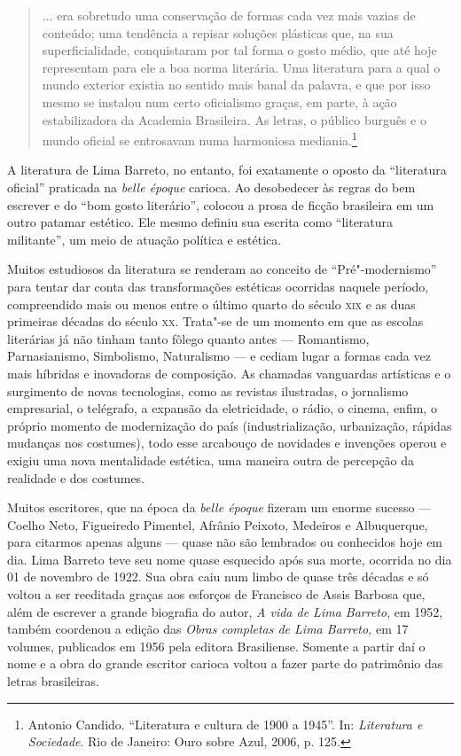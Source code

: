 \documentclass[11pt]{extarticle}
\begin{document}
{{\begin{quote}
... era sobretudo uma conservação de formas cada vez mais vazias de
conteúdo; uma tendência a repisar soluções plásticas que, na sua
superficialidade, conquistaram por tal forma o gosto médio, que até hoje
representam para ele a boa norma literária. Uma literatura para a qual o
mundo exterior existia no sentido mais banal da palavra, e que por isso
mesmo se instalou num certo oficialismo graças, em parte, à ação
estabilizadora da Academia Brasileira. As letras, o público burguês e o
mundo oficial se entrosavam numa harmoniosa mediania.\footnote{Antonio Candido. 
``Literatura e cultura de 1900 a 1945''. In: \emph{Literatura
  e Sociedade}. Rio de Janeiro: Ouro sobre Azul, 2006, p. 125.}
\end{quote}

A literatura de Lima Barreto, no entanto, foi exatamente o oposto da
``literatura oficial'' praticada na \emph{belle époque} carioca. Ao
desobedecer às regras do bem escrever e do ``bom gosto literário'',
colocou a prosa de ficção brasileira em um outro patamar estético. Ele
mesmo definiu sua escrita como ``literatura militante'', um meio de
atuação política e estética.

Muitos estudiosos da literatura se renderam ao conceito de
``Pré"-modernismo'' para tentar dar conta das transformações estéticas
ocorridas naquele período, compreendido mais ou menos entre o último
quarto do século \textsc{xix} e as duas primeiras décadas do século \textsc{xx}. Trata"-se
de um momento em que as escolas literárias já não tinham tanto fôlego
quanto antes --- Romantismo, Parnasianismo, Simbolismo, Naturalismo --- e
cediam lugar a formas cada vez mais híbridas e inovadoras de composição.
As chamadas vanguardas artísticas e o surgimento de novas tecnologias,
como as revistas ilustradas, o jornalismo empresarial, o telégrafo, a
expansão da eletricidade, o rádio, o cinema, enfim, o próprio momento de
modernização do país (industrialização, urbanização, rápidas mudanças
nos costumes), todo esse arcabouço de novidades e invenções operou e
exigiu uma nova mentalidade estética, uma maneira outra de percepção da
realidade e dos costumes.

Muitos escritores, que na época da \emph{belle époque} fizeram um enorme
sucesso --- Coelho Neto, Figueiredo Pimentel, Afrânio Peixoto, Medeiros e
Albuquerque, para citarmos apenas alguns --- quase não são lembrados ou
conhecidos hoje em dia. Lima Barreto teve seu nome quase esquecido após
sua morte, ocorrida no dia 01 de novembro de 1922. Sua obra caiu num
limbo de quase três décadas e só voltou a ser reeditada graças aos
esforços de Francisco de Assis Barbosa que, além de escrever a grande
biografia do autor, \emph{A vida de Lima Barreto}, em 1952, também
coordenou a edição das \emph{Obras completas de Lima Barreto,} em 17
volumes, publicados em 1956 pela editora Brasiliense. Somente a partir
daí o nome e a obra do grande escritor carioca voltou a fazer parte do
patrimônio das letras brasileiras.

}}
\end{document}
